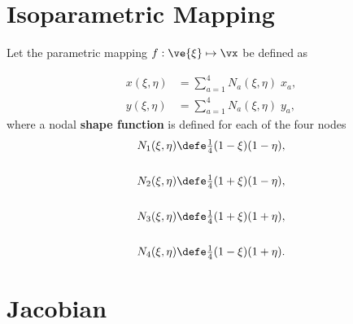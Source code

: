 \documentclass[14pt,letterpaper,fleqn]{extreport}
\begin{document}
\clearpage

\section{Isoparametric Mapping}
Let the parametric mapping $f: \ve{\xi} \mapsto \vx$ be defined as

\begin{align}
  x(\xi,\eta) & = \sum_{a=1}^4 N_a(\xi, \eta) \; x_a, \label{eq:shapex} \\
  y(\xi,\eta) & = \sum_{a=1}^4 N_a(\xi, \eta) \; y_a, \label{eq:shapey}
\end{align}
where a nodal {\bf shape function} is defined for each of the four nodes
\begin{align}
  N_1(\xi, \eta) & \defe \tfrac{1}{4} (1 - \xi) (1 - \eta), \\
  & \nonumber \\
  N_2(\xi, \eta) & \defe \tfrac{1}{4} (1 + \xi) (1 - \eta), \\
  & \nonumber \\
  N_3(\xi, \eta) & \defe \tfrac{1}{4} (1 + \xi) (1 + \eta), \\
  & \nonumber \\
  N_4(\xi, \eta) & \defe \tfrac{1}{4} (1 - \xi) (1 + \eta).
\end{align}

\clearpage

\section{Jacobian}
\end{document}
